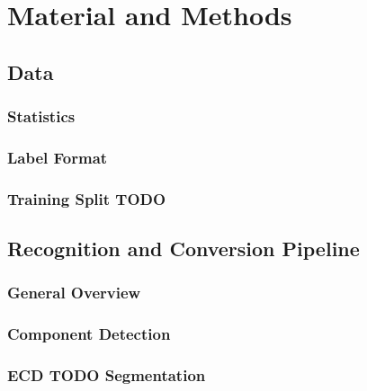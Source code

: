 \chapter{Material and Methods}

\section{Data}

\subsection{Statistics}

\subsection{Label Format}

\subsection{Training Split TODO}

\section{Recognition and Conversion Pipeline}

\subsection{General Overview}

\subsection{Component Detection}

\subsection{ECD TODO Segmentation}

\subsection{}
